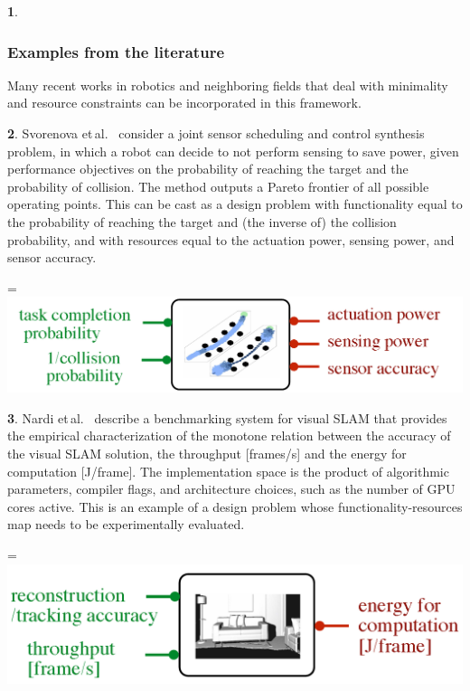 \documentclass[twocolumn,english]{IEEEtran}
\theoremstyle{definition}
\theoremstyle{plain}
\theoremstyle{definition}
\newtheorem{example}{\protect\examplename}
\theoremstyle{remark}
\theoremstyle{definition}
\theoremstyle{plain}
\theoremstyle{plain}
\newcommand{\etal}{{et\,al.}\xspace}
\newcommand{\colR}{\color[rgb]{0.555789,0.000000,0.000000}}
\newcommand{\colF}{\color[rgb]{0.094869,0.500000,0.000000}}
\newcommand{\R}[1]{{\colR #1}}
\newcommand{\F}[1]{{\colF #1}}
\newcommand*{\vcenteredhbox}[1]{\begingroup
\setbox0=\hbox{#1}\parbox{\wd0}{\box0}\endgroup}
\newcommand{\captionsideleft}[2]{
    \medskip
    \begin{minipage}{1.8cm}{
        \hfill
        \protect\captionof{figure}{#1}}\end{minipage}
    \begin{minipage}{6.6cm}
    
    \vcenteredhbox{{#2}}
    \hfill
    \end{minipage}
    \medskip
}
\providecommand{\examplename}{Example}
\begin{document}
\begin{example}
\end{example}

\subsubsection*{Examples from the literature}

Many recent works in robotics and neighboring fields that deal with
minimality and resource constraints can be incorporated in this framework.

\begin{example}
Svorenova\,\,\etal~\cite{svorenova16resource} consider a joint
sensor scheduling and control synthesis problem, in which a robot
can decide to not perform sensing to save power, given performance
objectives on the probability of reaching the target and the probability
of collision. The method outputs a Pareto frontier of all possible
operating points. This can be cast as a design problem with functionality
equal to the \F{probability of reaching the target} and (the inverse
of) \F{the collision probability}, and with resources equal to the
\R{actuation power}, \R{sensing power}, and \R{sensor accuracy}.
 
\end{example}
\captionsideleft{\label{fig:progressive-1-1}}{\includegraphics[scale=0.33]{batteries_svorenova}}


\begin{example}
Nardi\,\,\etal~\cite{zia16comparative} describe a benchmarking
system for visual SLAM that provides the empirical characterization
of the monotone relation between \F{the accuracy} of the visual
SLAM solution, the \F{throughput {[}frames/s{]}} and \R{the energy
for computation {[}J/frame{]}}. The implementation space is the product
of algorithmic parameters, compiler flags, and architecture choices,
such as the number of GPU cores active. This is an example of a design
problem whose functionality-resources map needs to be experimentally
evaluated.
\end{example}
\captionsideleft{}{\includegraphics[scale=0.33]{batteries_zia}}
\end{document}
